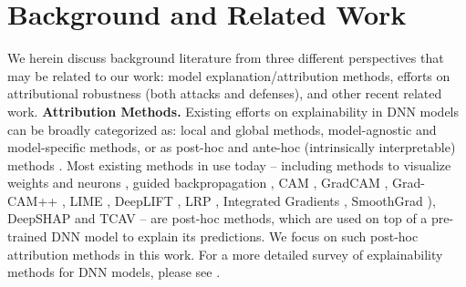 \documentclass[letterpaper]{article} %
\begin{document}
\section{Background and Related Work}
\label{sec_related_work}
We herein discuss background literature from three different perspectives that may be related to our work: model explanation/attribution methods, efforts on attributional robustness (both attacks and defenses), and other recent related work.
%
\noindent \textbf{Attribution Methods.} Existing efforts on explainability in DNN models can be broadly categorized as: local and global methods, model-agnostic and model-specific methods, or as post-hoc and ante-hoc (intrinsically interpretable) methods \citep{molnar2019,xaitutorial}. Most existing methods in use today -- including methods to visualize weights and neurons \citep{simonyan2014deep,ZeilerF14}, guided backpropagation \citep{springenberg2015striving}, CAM \citep{ZhouKLOT16}, GradCAM \citep{Selvaraju_2019}, Grad-CAM++ \citep{Chattopadhay_2018}, LIME \citep{ribeiro2016why}, DeepLIFT \citep{shrikumar2017just,shrikumar2019learning}, LRP \citep{bach2015lrp}, Integrated Gradients \citep{SundararajanTY17}, SmoothGrad \citep{smilkov2017smoothgrad}), DeepSHAP \citep{lundberg2017unified} and TCAV \citep{kim2018interpretability} -- are post-hoc methods, which are used on top of a pre-trained DNN model to explain its predictions. We focus on such post-hoc attribution methods in this work. For a more detailed survey of explainability methods for DNN models, please see \citep{xaitutorial,molnar2019,samek_explainable_2019}. 
%
\end{document}
